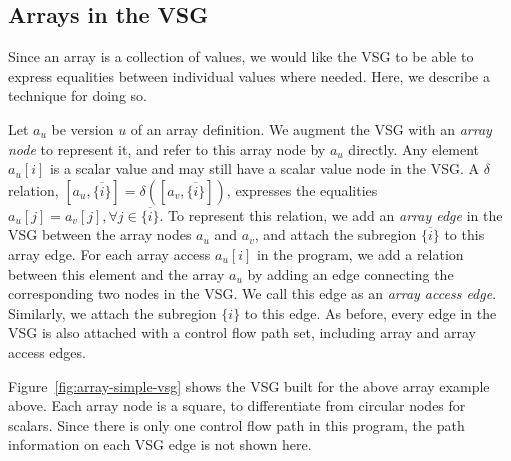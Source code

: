 \subsection{Arrays in the VSG}

Since an array is a collection of values, we would like the VSG to be able to express equalities between individual values where needed.
Here, we describe a technique for doing so.
 
Let $a_u$ be version $u$ of an array definition.
We augment the VSG with an \emph{array node} to represent it, and refer to this array node by $a_u$ directly.
Any element $a_u[i]$ is a scalar value
and may still have a scalar value node in the VSG.
A $\delta$ relation, $[a_u, \overline{\{i\}}]=\delta ([a_v, \overline{\{i\}}])$, expresses the equalities $a_u[j]=a_v[j], \forall j\in \overline{\{i\}}$.
To represent this relation, we add an \emph{array edge} in the VSG between the array nodes $a_u$ and $a_v$, and attach the subregion $\overline{\{i\}}$ to this array edge.
For each array access $a_u[i]$ in the program, we add a relation between this element and the array $a_u$ by adding an edge connecting the corresponding two nodes in the VSG.
We call this edge as an \emph{array access edge}.
Similarly, we attach the subregion $\{i\}$ to this edge.
As before, every edge in the VSG is also attached with a control flow path set, including array and array access edges.


Figure~\ref{fig:array-simple-vsg} shows the VSG built for the above array example above.
Each array node is a square, to differentiate from circular nodes for scalars. 
Since there is only one control flow path in this program, the path information on each VSG edge is not shown here.

